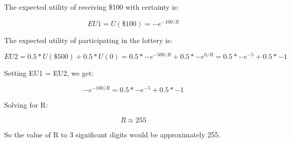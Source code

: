 \documentclass{article}
\begin{document}
The expected utility of receiving \$100 with certainty is:

\[EU1 = U(\$100) = -e^{-100/R}\]

The expected utility of participating in the lottery is:

\[EU2 = 0.5 * U(\$500) + 0.5 * U(0) = 0.5 * -e^{-500/R} + 0.5 * -e^{0/R} = 0.5 * -e^{-5} + 0.5 * -1\]

Setting EU1 = EU2, we get:

\[-e^{-100/R} = 0.5 * -e^{-5} + 0.5 * -1\]

Solving for R:

\[R \approx 255\]

So the value of R to 3 significant digits would be approximately 255.
\end{document}

